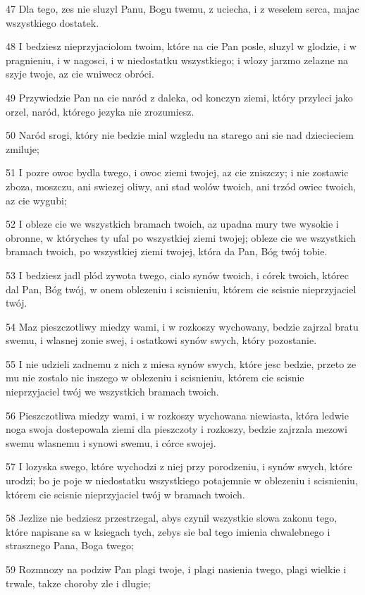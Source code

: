 \par 47 Dla tego, zes nie sluzyl Panu, Bogu twemu, z uciecha, i z weselem serca, majac wszystkiego dostatek.
\par 48 I bedziesz nieprzyjaciolom twoim, które na cie Pan posle, sluzyl w glodzie, i w pragnieniu, i w nagosci, i w niedostatku wszystkiego; i wlozy jarzmo zelazne na szyje twoje, az cie wniwecz obróci.
\par 49 Przywiedzie Pan na cie naród z daleka, od konczyn ziemi, który przyleci jako orzel, naród, którego jezyka nie zrozumiesz.
\par 50 Naród srogi, który nie bedzie mial wzgledu na starego ani sie nad dziecieciem zmiluje;
\par 51 I pozre owoc bydla twego, i owoc ziemi twojej, az cie zniszczy; i nie zostawic zboza, moszczu, ani swiezej oliwy, ani stad wolów twoich, ani trzód owiec twoich, az cie wygubi;
\par 52 I obleze cie we wszystkich bramach twoich, az upadna mury twe wysokie i obronne, w któryches ty ufal po wszystkiej ziemi twojej; obleze cie we wszystkich bramach twoich, po wszystkiej ziemi twojej, która da Pan, Bóg twój tobie.
\par 53 I bedziesz jadl plód zywota twego, cialo synów twoich, i córek twoich, którec dal Pan, Bóg twój, w onem oblezeniu i scisnieniu, którem cie scisnie nieprzyjaciel twój.
\par 54 Maz pieszczotliwy miedzy wami, i w rozkoszy wychowany, bedzie zajrzal bratu swemu, i wlasnej zonie swej, i ostatkowi synów swych, który pozostanie.
\par 55 I nie udzieli zadnemu z nich z miesa synów swych, które jesc bedzie, przeto ze mu nie zostalo nic inszego w oblezeniu i scisnieniu, którem cie scisnie nieprzyjaciel twój we wszystkich bramach twoich.
\par 56 Pieszczotliwa miedzy wami, i w rozkoszy wychowana niewiasta, która ledwie noga swoja dostepowala ziemi dla pieszczoty i rozkoszy, bedzie zajrzala mezowi swemu wlasnemu i synowi swemu, i córce swojej.
\par 57 I lozyska swego, które wychodzi z niej przy porodzeniu, i synów swych, które urodzi; bo je poje w niedostatku wszystkiego potajemnie w oblezeniu i scisnieniu, którem cie scisnie nieprzyjaciel twój w bramach twoich.
\par 58 Jezlize nie bedziesz przestrzegal, abys czynil wszystkie slowa zakonu tego, które napisane sa w ksiegach tych, zebys sie bal tego imienia chwalebnego i strasznego Pana, Boga twego;
\par 59 Rozmnozy na podziw Pan plagi twoje, i plagi nasienia twego, plagi wielkie i trwale, takze choroby zle i dlugie;
